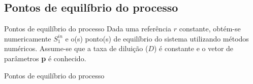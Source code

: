 \documentclass[10pt]{beamer}
\begin{document}
\subsection{Pontos de equilíbrio do processo}
\begin{frame}[fragile]{Pontos de equilíbrio do processo}
Dada uma referência $r$ constante, obtém-se numericamente $S_{1}^{in}$ e o(s) ponto(s) de equilíbrio do sistema utilizando métodos numéricos. Assume-se que a taxa de diluição ($D$) é constante e o vetor de parâmetros \textbf{p} é conhecido. 
\end{frame}

\begin{frame}[fragile]{Pontos de equilíbrio do processo}

\begin{columns}

\begin{column}{0.5\textwidth}
\begin{footnotesize}


\end{footnotesize}
\end{column}
\end{columns}
\end{frame}
\end{document}
